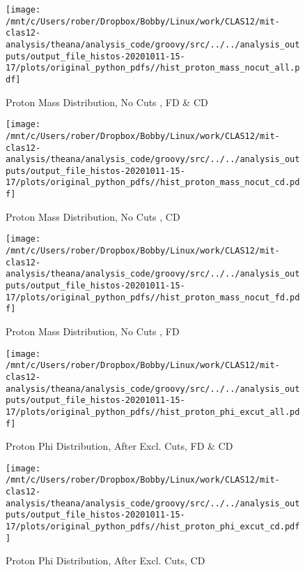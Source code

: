 \documentclass{article}
\begin{document}
\begin{landscape}
    \begin{figure}[h]
        \centering

        \texttt{[image: /mnt/c/Users/rober/Dropbox/Bobby/Linux/work/CLAS12/mit-clas12-analysis/theana/analysis\_code/groovy/src/../../analysis\_outputs/output\_file\_histos-20201011-15-17/plots/original\_python\_pdfs//hist\_proton\_mass\_nocut\_all.pdf]}
        \captionsetup{textformat=empty,labelformat=blank}
        \caption{Proton Mass Distribution, No Cuts , FD \& CD}
    \end{figure}
    \clearpage
    
    \begin{figure}[h]
        \centering

        \texttt{[image: /mnt/c/Users/rober/Dropbox/Bobby/Linux/work/CLAS12/mit-clas12-analysis/theana/analysis\_code/groovy/src/../../analysis\_outputs/output\_file\_histos-20201011-15-17/plots/original\_python\_pdfs//hist\_proton\_mass\_nocut\_cd.pdf]}
        \captionsetup{textformat=empty,labelformat=blank}
        \caption{Proton Mass Distribution, No Cuts , CD}
    \end{figure}
    \clearpage
    
    \begin{figure}[h]
        \centering

        \texttt{[image: /mnt/c/Users/rober/Dropbox/Bobby/Linux/work/CLAS12/mit-clas12-analysis/theana/analysis\_code/groovy/src/../../analysis\_outputs/output\_file\_histos-20201011-15-17/plots/original\_python\_pdfs//hist\_proton\_mass\_nocut\_fd.pdf]}
        \captionsetup{textformat=empty,labelformat=blank}
        \caption{Proton Mass Distribution, No Cuts , FD}
    \end{figure}
    \clearpage
    
    \begin{figure}[h]
        \centering

        \texttt{[image: /mnt/c/Users/rober/Dropbox/Bobby/Linux/work/CLAS12/mit-clas12-analysis/theana/analysis\_code/groovy/src/../../analysis\_outputs/output\_file\_histos-20201011-15-17/plots/original\_python\_pdfs//hist\_proton\_phi\_excut\_all.pdf]}
        \captionsetup{textformat=empty,labelformat=blank}
        \caption{Proton Phi Distribution, After Excl. Cuts, FD \& CD}
    \end{figure}
    \clearpage
    
    \begin{figure}[h]
        \centering

        \texttt{[image: /mnt/c/Users/rober/Dropbox/Bobby/Linux/work/CLAS12/mit-clas12-analysis/theana/analysis\_code/groovy/src/../../analysis\_outputs/output\_file\_histos-20201011-15-17/plots/original\_python\_pdfs//hist\_proton\_phi\_excut\_cd.pdf]}
        \captionsetup{textformat=empty,labelformat=blank}
        \caption{Proton Phi Distribution, After Excl. Cuts, CD}
    \end{figure}
    \clearpage
    

\end{landscape}
\end{document}
